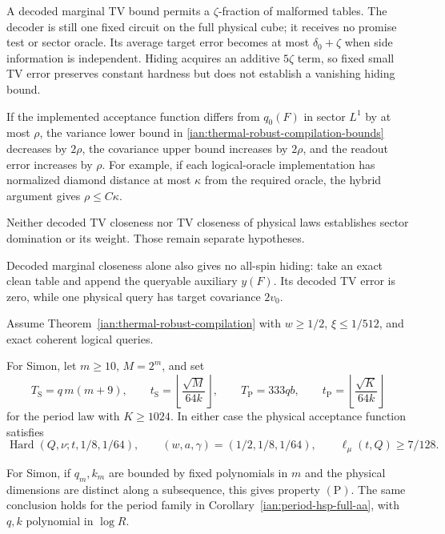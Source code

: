 \begin{remark}
\label{ian:thermal-robust-decoder-scope}
A decoded marginal TV bound permits a \(\zeta\)-fraction of malformed
tables. The decoder is still one fixed circuit on the full physical
cube; it receives no promise test or sector oracle. Its average target
error becomes at most \(\delta_0+\zeta\) when side information is
independent. Hiding acquires an additive \(5\zeta\) term, so fixed
small TV error preserves constant hardness but does not establish
a vanishing hiding bound.

If the implemented acceptance function differs from \(q_0(F)\)
in sector \(L^1\) by at most \(\rho\), the variance lower bound in
\eqref{ian:thermal-robust-compilation-bounds} decreases by \(2\rho\),
the covariance upper bound increases by \(2\rho\), and the readout
error increases by \(\rho\). For example, if each logical-oracle
implementation has normalized diamond distance at most \(\kappa\)
from the required oracle, the hybrid argument gives
\(\rho\le C\kappa\).

Neither decoded TV closeness nor TV closeness of physical laws
establishes sector domination or its weight. Those remain separate
hypotheses.

Decoded marginal closeness alone also gives no all-spin hiding:
take an exact clean table and append the queryable auxiliary
\(y(F)\). Its decoded TV error is zero, while one physical query
has target covariance \(2v_0\).
\end{remark}

\begin{corollary}
\label{ian:thermal-robust-packages}
Assume Theorem~\ref{ian:thermal-robust-compilation} with \(w\ge1/2\),
\(\xi\le1/512\), and exact coherent logical queries.

For Simon, let \(m\ge10\), \(M=2^m\), and set
\[
 T_{\mathrm S}=q\,m(m+9),\qquad
 t_{\mathrm S}=
       \left\lfloor\frac{\sqrt M}{64k}\right\rfloor ,
 \qquad
 T_{\mathrm P}=333qb,\qquad
 t_{\mathrm P}=
       \left\lfloor\frac{\sqrt K}{64k}\right\rfloor
 \tag{38.6}
\]
for the period law with \(K\ge1024\).
In either case the physical acceptance function satisfies
\[
 \operatorname{Hard}(Q,\nu;t,1/8,1/64),\qquad
 (w,a,\gamma)=(1/2,1/8,1/64),\qquad
 \ell_\mu(t,Q)\ge7/128 .
 \tag{38.7}\label{ian:thermal-robust-constant-package}
\]

For Simon, if \(q_m,k_m\) are bounded by fixed polynomials in \(m\)
and the physical dimensions are distinct along a subsequence, this
gives property \(\mathrm{(P)}\). The same conclusion holds for the
period family in Corollary~\ref{ian:period-hsp-full-aa}, with
\(q,k\) polynomial in \(\log R\).
\end{corollary}

